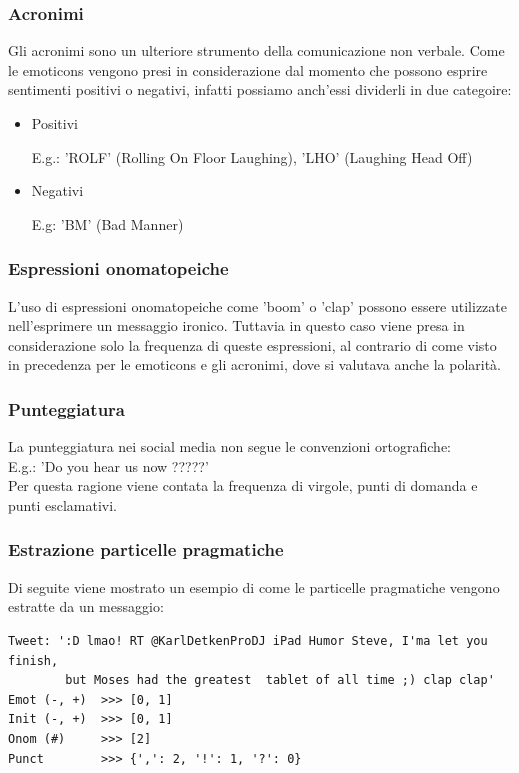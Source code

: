 \documentclass[oneside]{book}
\begin{document}
\subsubsection{Acronimi}
Gli acronimi sono un ulteriore strumento della comunicazione non verbale. Come le emoticons vengono presi in considerazione dal momento che possono esprire sentimenti positivi o negativi, infatti possiamo anch'essi dividerli in due categoire:

\begin{itemize}
	\item
	Positivi
	
	E.g.: 'ROLF' (Rolling On Floor Laughing), 'LHO' (Laughing Head Off)
	\item
	Negativi
	
	E.g: 'BM' (Bad Manner)
	
\end{itemize}

\subsubsection{Espressioni onomatopeiche}
L'uso di espressioni onomatopeiche come 'boom' o 'clap' possono essere utilizzate nell'esprimere un messaggio ironico. Tuttavia in questo caso viene presa in considerazione solo la frequenza di queste espressioni, al contrario di come visto in precedenza per le emoticons e gli acronimi, dove si valutava anche la polarità.

\subsubsection{Punteggiatura}
La punteggiatura nei social media non segue le convenzioni ortografiche:\\
E.g.: 'Do you hear us now ?????'\\
Per questa ragione viene contata la frequenza di virgole, punti di domanda e punti esclamativi.

\subsubsection{Estrazione particelle pragmatiche}
Di seguite viene mostrato un esempio di come le particelle pragmatiche vengono estratte da un messaggio:

\begin{lstlisting}[caption={Esempio di tweet processato per estrarre le particelle pragmatiche.}]
Tweet: ':D lmao! RT @KarlDetkenProDJ iPad Humor Steve, I'ma let you finish,
        but Moses had the greatest  tablet of all time ;) clap clap'
Emot (-, +)  >>> [0, 1]
Init (-, +)  >>> [0, 1]
Onom (#)     >>> [2]
Punct        >>> {',': 2, '!': 1, '?': 0}
\end{lstlisting}
\end{document}
